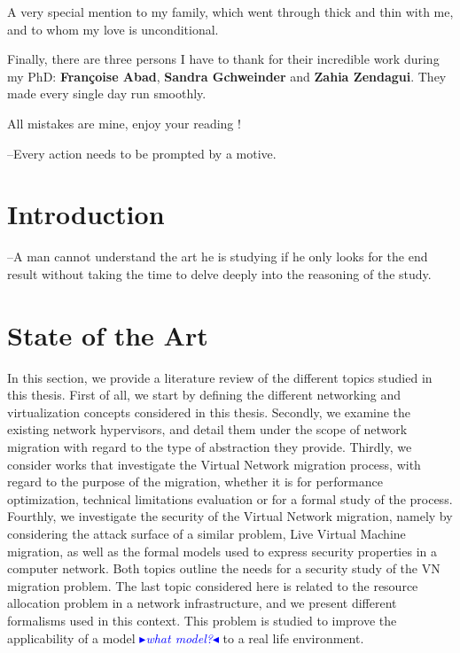 \documentclass[a4paper, 11pt]{report}
\newcommand{\boxedtext}[1]{\fbox{\scriptsize\bfseries\textsf{#1}}}
\newcommand{\myremark}[2]{
   \textcolor{blue}{\boxedtext{#1}
      {\small$\blacktriangleright$\emph{\textsl{#2}}$\blacktriangleleft$}
}}
\newcommand\GB[1]{\myremark{GB}{#1}}
\theoremstyle{definition}
\begin{document}
A very special mention to my family, which went through thick and thin with me, and to whom my love is unconditional. 

Finally, there are three persons I have to thank for their incredible work during my PhD: \textbf{Fran\c{c}oise Abad}, \textbf{Sandra Gchweinder} and \textbf{Zahia Zendagui}. They made every single day run smoothly.

All mistakes are mine, enjoy your reading !

\newpage

\tableofcontents
\listoffigures
 \listoftables
\thispagestyle{empty}


\newpage
{}
\begin{savequote}
--Every action needs to be prompted by a motive.
\end{savequote}
\chapter{Introduction}

 

\newpage
\begin{savequote}[0.5\textwidth]
--A man cannot understand the art he is studying if he only looks for the end result without taking the time to delve deeply into the reasoning of the study.
\end{savequote}
\chapter{State of the Art}
\label{sec:sota}
In this section, we provide a literature review of the different topics studied in this thesis.
First of all, we start by defining the different networking and virtualization concepts considered in this thesis.
Secondly, we examine the existing network hypervisors, and detail them under the scope of network migration with regard to the type of abstraction they provide.
Thirdly, we consider works that investigate the Virtual Network migration process, with regard to the purpose of the migration, whether it is for performance optimization, technical limitations evaluation or for a formal study of the process.
Fourthly, we investigate the security of the Virtual Network migration, namely by considering the attack surface of a similar problem, Live Virtual Machine migration, as well as the formal models used to express security properties in a computer network.
Both topics outline the needs for a security study of the VN migration problem.
The last topic considered here is related to the resource allocation problem in a network infrastructure, and we present different formalisms used in this context.
This problem is studied to improve the applicability of a model\GB{what model?} to a real life environment.
\end{document}
